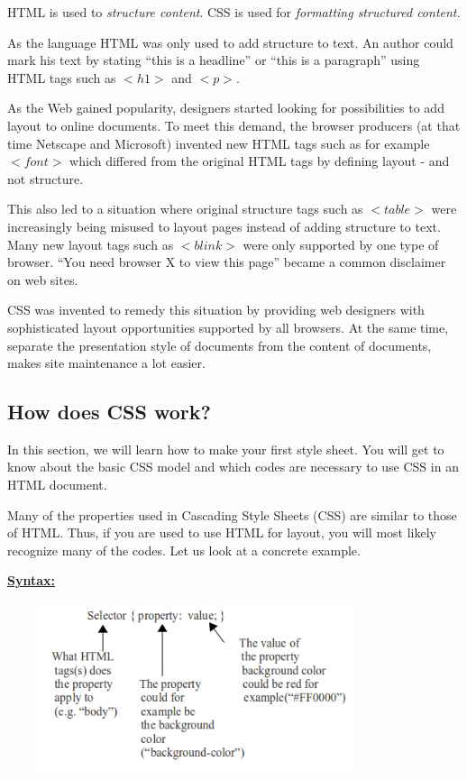 \documentclass[11pt,a4paper]{article}
\begin{document}
HTML is used to \emph{structure content}. CSS is used for \emph{formatting structured content.}

As the language HTML was only used to add structure to text. An author could mark his text by stating ``this is a headline'' or ``this is a paragraph'' using HTML tags such as $<h1>$ and $<p>$.

As the Web gained popularity, designers started looking for possibilities to add layout to online documents. To meet this demand, the browser producers (at that time Netscape and Microsoft) invented new HTML tags such as for example $<font>$ which differed from the original HTML tags by defining layout - and not structure.

This also led to a situation where original structure tags such as $<table>$ were increasingly being misused to layout pages instead of adding structure to text. Many new layout tags such as $<blink>$ were only supported by one type of browser. ``You need browser X to view this page'' became a common disclaimer on web sites.

CSS was invented to remedy this situation by providing web designers with sophisticated layout opportunities supported by all browsers. At the same time, separate the presentation style of documents from the content of documents, makes site maintenance a lot easier.

\subsection*{How does CSS work?}
In this section, we will learn how to make your first style sheet. You will get to know about the basic CSS model and which codes are necessary to use CSS in an HTML document.

Many of the properties used in Cascading Style Sheets (CSS) are similar to those of HTML. Thus, if you are used to use HTML for layout, you will most likely recognize many of the codes. Let us look at a concrete example.

\underline{\textbf{Syntax:}}
\begin{center}
\includegraphics[height=50mm, width=110mm]{Syntax.png}
\end{center}
\end{document}
